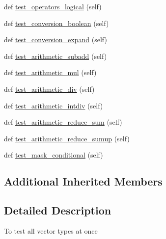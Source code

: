 \begin{DoxyCompactItemize}
\item 
def \hyperlink{classnumpy_1_1core_1_1tests_1_1test__simd_1_1__SIMD__ALL_ac3afbbfc29597b2415f610878481b829}{test\+\_\+operators\+\_\+logical} (self)
\item 
def \hyperlink{classnumpy_1_1core_1_1tests_1_1test__simd_1_1__SIMD__ALL_a0d0f96bbc8091738e173d151a4b641cb}{test\+\_\+conversion\+\_\+boolean} (self)
\item 
def \hyperlink{classnumpy_1_1core_1_1tests_1_1test__simd_1_1__SIMD__ALL_a536513bac8d046b11fafb955b189fa40}{test\+\_\+conversion\+\_\+expand} (self)
\item 
def \hyperlink{classnumpy_1_1core_1_1tests_1_1test__simd_1_1__SIMD__ALL_a500dc991e2c49af44eb75cb858ca3688}{test\+\_\+arithmetic\+\_\+subadd} (self)
\item 
def \hyperlink{classnumpy_1_1core_1_1tests_1_1test__simd_1_1__SIMD__ALL_a738bd4d513f94489854bdf5a75a828a5}{test\+\_\+arithmetic\+\_\+mul} (self)
\item 
def \hyperlink{classnumpy_1_1core_1_1tests_1_1test__simd_1_1__SIMD__ALL_a7d67bde372aa04d5440189b45803dcd1}{test\+\_\+arithmetic\+\_\+div} (self)
\item 
def \hyperlink{classnumpy_1_1core_1_1tests_1_1test__simd_1_1__SIMD__ALL_ad37d2bdd31f184d7e2f046a4c1098ea2}{test\+\_\+arithmetic\+\_\+intdiv} (self)
\item 
def \hyperlink{classnumpy_1_1core_1_1tests_1_1test__simd_1_1__SIMD__ALL_a1e0b9f0ab098af7275080f6029260337}{test\+\_\+arithmetic\+\_\+reduce\+\_\+sum} (self)
\item 
def \hyperlink{classnumpy_1_1core_1_1tests_1_1test__simd_1_1__SIMD__ALL_a8a166397169a665f4fb4f3dd6b5eb9ba}{test\+\_\+arithmetic\+\_\+reduce\+\_\+sumup} (self)
\item 
def \hyperlink{classnumpy_1_1core_1_1tests_1_1test__simd_1_1__SIMD__ALL_aff23c4540485dd68036c995bf2867789}{test\+\_\+mask\+\_\+conditional} (self)
\end{DoxyCompactItemize}
\subsection*{Additional Inherited Members}


\subsection{Detailed Description}
\begin{DoxyVerb}To test all vector types at once
\end{DoxyVerb}
 

